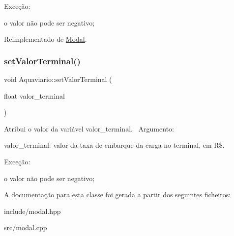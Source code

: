Exceção\+:
\begin{DoxyItemize}
\item o valor não pode ser negativo;
\end{DoxyItemize}

Reimplementado de \hyperlink{classModal_a20cee7247cce33806d681e1d60347cc5}{Modal}.

\mbox{\label{classAquaviario_a9d2a7813c34be1532570788e15b1fd2a}} 
\subsubsection{\texorpdfstring{set\+Valor\+Terminal()}{setValorTerminal()}}
{\footnotesize\ttfamily void Aquaviario\+::set\+Valor\+Terminal (\begin{DoxyParamCaption}\item[{float}]{valor\+\_\+terminal }\end{DoxyParamCaption})}

Atribui o valor da variável valor\+\_\+terminal.~\newline
 Argumento\+:
\begin{DoxyItemize}
\item valor\+\_\+terminal\+: valor da taxa de embarque da carga no terminal, em R\$.~\newline

\end{DoxyItemize}

Exceção\+:
\begin{DoxyItemize}
\item o valor não pode ser negativo;
\end{DoxyItemize}

A documentação para esta classe foi gerada a partir dos seguintes ficheiros\+:\begin{DoxyCompactItemize}
\item 
include/modal.\+hpp\item 
src/modal.\+cpp\end{DoxyCompactItemize}
